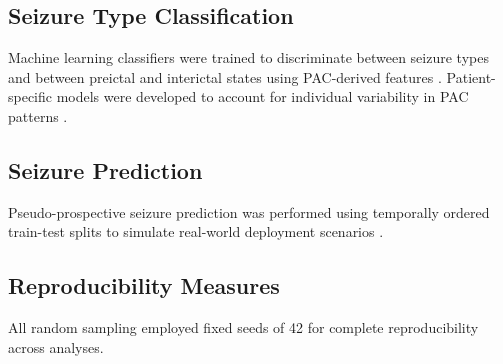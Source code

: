 

\subsection{Seizure Type Classification}
Machine learning classifiers were trained to discriminate between seizure types and between preictal and interictal states using PAC-derived features \cite{Messaoud2021RandomFCR,Usman2017EpilepticSPH}. Patient-specific models were developed to account for individual variability in PAC patterns \cite{Aldahr2023PatientSpecificPPL,Pinto2021APAP}.

\subsection{Seizure Prediction}
Pseudo-prospective seizure prediction was performed using temporally ordered train-test splits to simulate real-world deployment scenarios \cite{Kuhlmann2018SeizurePA,Hussein2022MultiChannelVTE}.

\subsection{Reproducibility Measures}
All random sampling employed fixed seeds of 42 for complete reproducibility across analyses.

\label{sec:methods}

